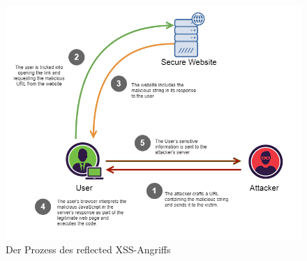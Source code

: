 





\begin{figure}[ht]
	\centering
	\includegraphics[width=1\linewidth]{images/medium/2_reflected_xss.png}
	\caption[Der Prozess des reflected XSS-Angriffs]
	{Der Prozess des reflected XSS-Angriffs \textcite{makarem2018a}}
\end{figure}

